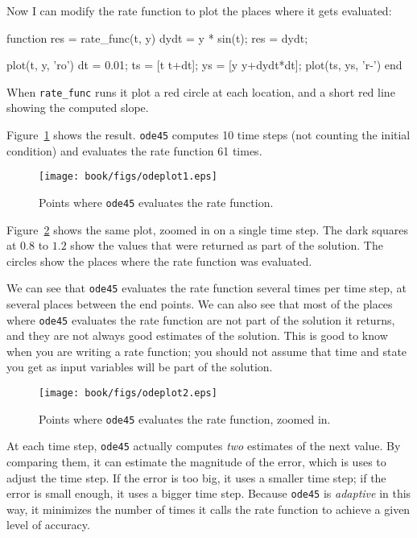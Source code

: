 
Now I can modify the rate function to plot the places where it gets evaluated:

\begin{code}
function res = rate_func(t, y)
    dydt = y * sin(t);
    res = dydt;

    plot(t, y, 'ro')
    dt = 0.01;
    ts = [t t+dt];
    ys = [y y+dydt*dt];
    plot(ts, ys, 'r-')
end
\end{code}

When \verb"rate_func" runs it plot a red circle at each location, and a short red line showing the computed slope.


Figure~\ref{fig:odeplot1} shows the result.  {\tt ode45} computes 10 time steps (not counting the initial condition) and evaluates the rate function 61 times.

\begin{figure}
\centerline{\texttt{[image: book/figs/odeplot1.eps]}}
\caption{Points where {\tt ode45} evaluates the rate function.}
\label{fig:odeplot1}
\end{figure}

Figure~\ref{fig:odeplot2} shows the same plot, zoomed in on a single time step.  
The dark squares at $0.8$ to $1.2$ show the values that were returned as part of the solution.
The circles show the places where the rate function was evaluated.

We can see that {\tt ode45} evaluates the rate function several times per time step, at several places between the end points.  
We can also see that most of the places where {\tt ode45} evaluates the rate function are not part of the solution it returns, and they are not always good estimates of the solution.
This is good to know when you are writing a rate function; you should not assume that time and state you get as input variables will be part of the solution.

\begin{figure}
\centerline{\texttt{[image: book/figs/odeplot2.eps]}}
\caption{Points where {\tt ode45} evaluates the rate function, zoomed in.}
\label{fig:odeplot2}
\end{figure}

At each time step, {\tt ode45} actually computes {\em two} estimates of the next value.
By comparing them, it can estimate the magnitude of the error, which is uses to adjust the time step.
If the error is too big, it uses a smaller time step; if the error is small enough, it uses a bigger time step.
Because {\tt ode45} is \emph{adaptive} in this way, it minimizes the number of times it calls the rate function to achieve a given level of accuracy.

